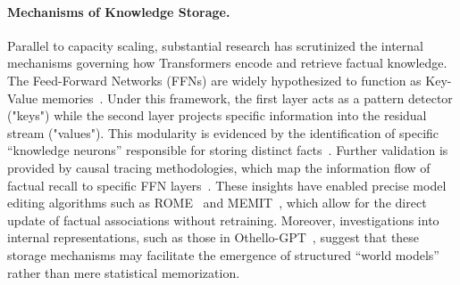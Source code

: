 \paragraph{Mechanisms of Knowledge Storage.}
Parallel to capacity scaling, substantial research has scrutinized the internal mechanisms governing how Transformers encode and retrieve factual knowledge. The Feed-Forward Networks (FFNs) are widely hypothesized to function as Key-Value memories~\citep{geva2021transformer}. Under this framework, the first layer acts as a pattern detector ("keys") while the second layer projects specific information into the residual stream ("values"). This modularity is evidenced by the identification of specific ``knowledge neurons'' responsible for storing distinct facts~\citep{dai2022knowledge}. Further validation is provided by causal tracing methodologies, which map the information flow of factual recall to specific FFN layers~\citep{meng2022locating}. These insights have enabled precise model editing algorithms such as ROME~\citep{meng2022locating} and MEMIT~\citep{meng2022mass}, which allow for the direct update of factual associations without retraining. Moreover, investigations into internal representations, such as those in Othello-GPT~\citep{li2024emergentworldrepresentationsexploring}, suggest that these storage mechanisms may facilitate the emergence of structured ``world models'' rather than mere statistical memorization.
